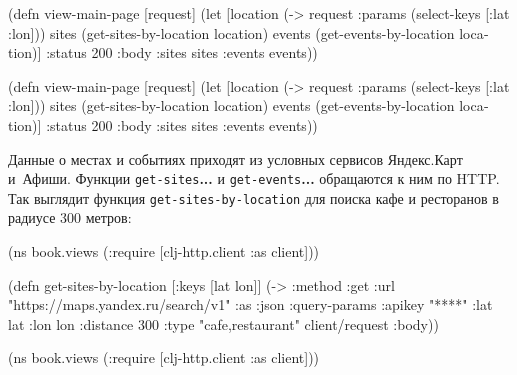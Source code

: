 \ifnarrow

\begin{english}
  \begin{clojure}
(defn view-main-page [request]
  (let [location
        (-> request
            :params
            (select-keys [:lat :lon]))
        sites
        (get-sites-by-location location)
        events
        (get-events-by-location
          location)]
    {:status 200
     :body {:sites sites
            :events events}}))
  \end{clojure}
\end{english}

\else

\begin{english}
  \begin{clojure}
(defn view-main-page [request]
  (let [location (-> request
                     :params
                     (select-keys [:lat :lon]))
        sites (get-sites-by-location location)
        events (get-events-by-location location)]
    {:status 200
     :body {:sites sites :events events}}))
  \end{clojure}
\end{english}

\fi

Данные о местах и событиях приходят из условных сервисов Яндекс.Карт
и~Афиши. Функции \verb|get-sites|\textbf{...} и \verb|get-events|\textbf{...}
обращаются к ним по HTTP. Так выглядит функция
\texttt{get\--sites\--by\--location} для поиска кафе и ресторанов в радиусе 300
метров:

\pagebreakafive


\ifnarrow

\begin{english}
  \begin{clojure}
(ns book.views
  (:require
   [clj-http.client :as client]))

(defn get-sites-by-location
  [{:keys [lat lon]}]
  (-> {:method :get
       :url
       "https://maps.yandex.ru/search/v1"
       :as :json
       :query-params
       {:apikey "****"
        :lat lat :lon lon :distance 300
        :type "cafe,restaurant"}}
      client/request
      :body))
  \end{clojure}
\end{english}

\else

\iflarge

\begin{english}
  \begin{clojure}
(ns book.views
  (:require [clj-http.client :as client]))
  \end{clojure}
\end{english}


